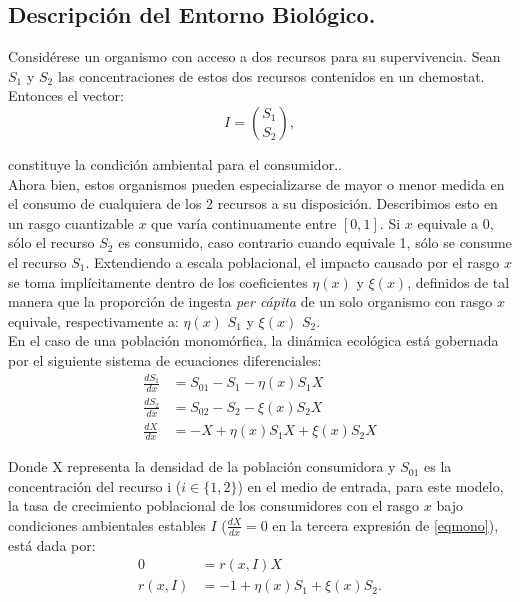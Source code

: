 		\subsection{Descripción del Entorno Biológico.}
			\normalsize{Consid\'erese un organismo con acceso a dos recursos para su supervivencia. Sean $S_1$ y $S_2$ las concentraciones de estos dos recursos contenidos en un chemostat. Entonces el vector:}
        \begin{equation}
        I=\binom{S_{1}}{S_{2}},
        \end{equation}

        \normalsize{constituye la condición ambiental para el consumidor.\citep{Diekmann2001, diekman2003}.}\\

        \normalsize{Ahora bien, estos organismos pueden especializarse de mayor o menor medida en el consumo de cualquiera de los 2 recursos a su disposici\'on. Describimos esto en un rasgo cuantizable $x$ que var\'ia continuamente entre $[0,1]$. Si $x$ equivale a 0, sólo el recurso $S_2$ es consumido, caso contrario cuando equivale 1, s\'olo se consume el recurso $S_1$. Extendiendo a escala poblacional, el impacto causado por el rasgo $x$ se toma impl\'icitamente dentro de los coeficientes $\eta(x)$ y $\xi(x)$, definidos de tal manera que la proporci\'on de ingesta \textit{per c\'apita} de un solo organismo con rasgo $x$ equivale, respectivamente a: $\eta(x)$ $S_1$ y $\xi(x)$ $S_2$.\citep{dieckman2005}}\\

        \normalsize{En el caso de una población monomórfica, la dinámica ecológica está gobernada por el siguiente sistema de ecuaciones diferenciales:}
        \begin{equation}\label{eqmono}
        \begin{split}
             \frac{d S_1}{dx}&=S_{01}-S_1-\eta(x)S_1X\\  \frac{d S_2}{dx}&=S_{02}-S_2-\xi(x)S_2X\\ \frac{d X}{dx}&=-X+\eta(x)S_1X+\xi(x)S_2X 
        \end{split}
        \end{equation}

        \normalsize{Donde X representa la densidad de la población consumidora y $S_{01}$ es la concentración del recurso i ($i\in\{1,2\}$) en el medio de entrada, para este modelo, la tasa de crecimiento poblacional de los consumidores con el rasgo $x$ bajo condiciones ambientales estables $I$ ($\frac{d X}{dx}=0$ en la tercera expresi\'on de \eqref{eqmono}), está dada por:}
        \begin{equation}\label{r}
        	\begin{split}
        			0&=r(x,I)X\\
            r(x,I)&=-1+\eta(x)S_1+\xi(x)S_2.
        	\end{split}
        \end{equation}
        
